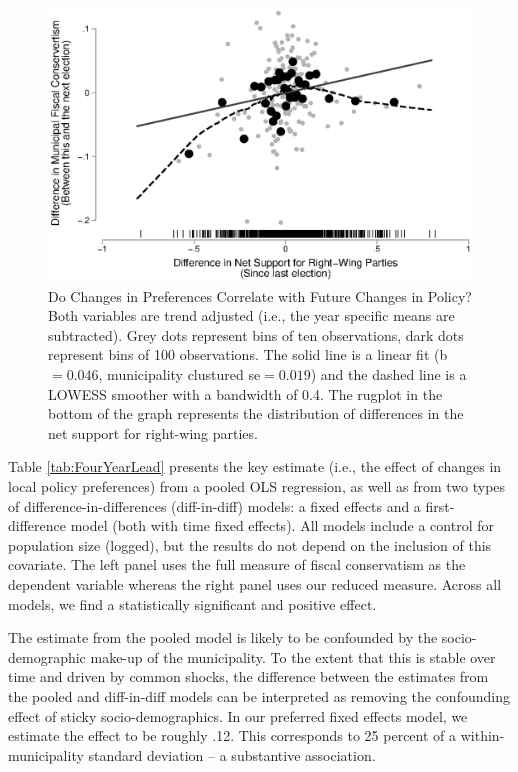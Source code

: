 \documentclass[a4paper,12pt]{article}
\begin{document}
\begin{figure}[h]
	\centering
	\includegraphics[scale = 0.8]{scatterplot.eps}
	\caption{Do Changes in Preferences Correlate with Future Changes in Policy? Both variables are trend adjusted (i.e., the year specific means are subtracted). Grey dots represent bins of ten observations, dark dots represent bins of 100  observations. The solid line is a linear fit (b$=0.046$, municipality clustured se$=0.019$) and the dashed line is a LOWESS smoother with a bandwidth of 0.4. The rugplot in the bottom of the graph represents the distribution of differences in the net support for right-wing parties. }
	\label{fig:scatter}
\end{figure}




Table \ref{tab:FourYearLead} presents the key estimate (i.e., the effect of changes in local policy preferences) from a pooled OLS regression, as well as from two types of difference-in-differences (diff-in-diff) models: a fixed effects and a first-difference model (both with time fixed effects). All models include a control for population size (logged), but the results do not depend on the inclusion of this covariate.  The  left panel uses the full measure of fiscal conservatism as the dependent variable whereas the right panel uses our reduced measure. Across all models, we find a statistically significant and positive effect.

The estimate from the pooled model is likely to be confounded by the socio-demographic make-up of the municipality. To the extent that this is stable over time and driven by common shocks, the difference between the estimates from the pooled and diff-in-diff models can be interpreted as removing the confounding effect of sticky socio-demographics. In our preferred fixed effects model, we estimate the effect to be roughly .12. This corresponds to 25 percent of a within-municipality standard deviation -- a substantive association. 
\end{document}
